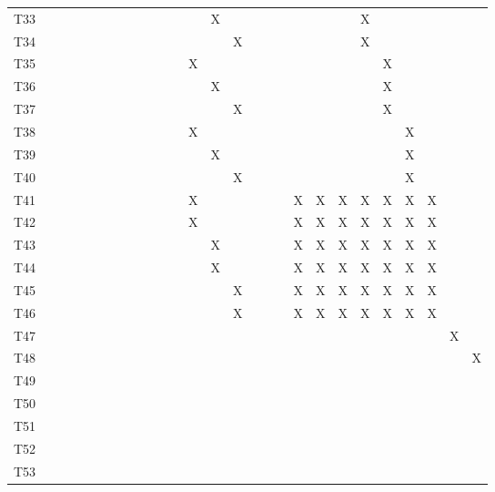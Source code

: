 \documentclass[]{article}
\begin{document}
\begin{longtable}[l]{lllllllllllllllllllllllllll}
\rowcolor{gray!6}  T33 &  &  &  &  &  &  &  &  &  &  &  &  & X &  &  &  &  &  &  &  & X &  &  &  &  & \\
T34 &  &  &  &  &  &  &  &  &  &  &  &  &  & X &  &  &  &  &  &  & X &  &  &  &  & \\
\rowcolor{gray!6}  T35 &  &  &  &  &  &  &  &  &  &  &  & X &  &  &  &  &  &  &  &  &  & X &  &  &  & \\
\addlinespace
T36 &  &  &  &  &  &  &  &  &  &  &  &  & X &  &  &  &  &  &  &  &  & X &  &  &  & \\
\rowcolor{gray!6}  T37 &  &  &  &  &  &  &  &  &  &  &  &  &  & X &  &  &  &  &  &  &  & X &  &  &  & \\
T38 &  &  &  &  &  &  &  &  &  &  &  & X &  &  &  &  &  &  &  &  &  &  & X &  &  & \\
\rowcolor{gray!6}  T39 &  &  &  &  &  &  &  &  &  &  &  &  & X &  &  &  &  &  &  &  &  &  & X &  &  & \\
T40 &  &  &  &  &  &  &  &  &  &  &  &  &  & X &  &  &  &  &  &  &  &  & X &  &  & \\
\addlinespace
\rowcolor{gray!6}  T41 &  &  &  &  &  &  &  &  &  &  &  & X &  &  &  &  &  & X & X & X & X & X & X & X &  & \\
T42 &  &  &  &  &  &  &  &  &  &  &  & X &  &  &  &  &  & X & X & X & X & X & X & X &  & \\
\rowcolor{gray!6}  T43 &  &  &  &  &  &  &  &  &  &  &  &  & X &  &  &  &  & X & X & X & X & X & X & X &  & \\
T44 &  &  &  &  &  &  &  &  &  &  &  &  & X &  &  &  &  & X & X & X & X & X & X & X &  & \\
\rowcolor{gray!6}  T45 &  &  &  &  &  &  &  &  &  &  &  &  &  & X &  &  &  & X & X & X & X & X & X & X &  & \\
\addlinespace
T46 &  &  &  &  &  &  &  &  &  &  &  &  &  & X &  &  &  & X & X & X & X & X & X & X &  & \\
\rowcolor{gray!6}  T47 &  &  &  &  &  &  &  &  &  &  &  &  &  &  &  &  &  &  &  &  &  &  &  &  & X & \\
T48 &  &  &  &  &  &  &  &  &  &  &  &  &  &  &  &  &  &  &  &  &  &  &  &  &  & X\\
\rowcolor{gray!6}  T49 &  &  &  &  &  &  &  &  &  &  &  &  &  &  &  &  &  &  &  &  &  &  &  &  &  & \\
T50 &  &  &  &  &  &  &  &  &  &  &  &  &  &  &  &  &  &  &  &  &  &  &  &  &  & \\
\addlinespace
\rowcolor{gray!6}  T51 &  &  &  &  &  &  &  &  &  &  &  &  &  &  &  &  &  &  &  &  &  &  &  &  &  & \\
T52 &  &  &  &  &  &  &  &  &  &  &  &  &  &  &  &  &  &  &  &  &  &  &  &  &  & \\
\rowcolor{gray!6}  T53 &  &  &  &  &  &  &  &  &  &  &  &  &  &  &  &  &  &  &  &  &  &  &  &  &  & \\*
\end{longtable}
\end{document}
